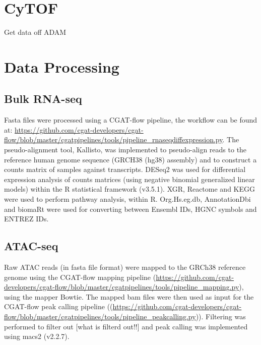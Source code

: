 \section{CyTOF}
Get data off ADAM


\section{Data Processing}\label{sec:data_processing}
\subsection{Bulk RNA-seq}
Fasta files were processed using a CGAT-flow\cite{sims2014cgat} pipeline, the workflow can be found at: \url{https://github.com/cgat-developers/cgat-flow/blob/master/cgatpipelines/tools/pipeline_rnaseqdiffexpression.py}.
The pseudo-alignment tool, Kallisto\cite{bray2016near}, was implemented to pseudo-align reads to the reference human genome sequence (GRCH38 (hg38) assembly) and to construct a counts matrix of samples against transcripts.
DESeq2\cite{love2014moderated} was used for differential expression analysis of  counts  matrices  (using  negative  binomial  generalized  linear  models) within the R statistical framework (v3.5.1).
XGR\cite{fang2016xgr}, Reactome\cite{fabregat2017reactome} and KEGG\cite{kanehisa2017kegg} were used to perform pathway analysis, within R\@.
Org.Hs.eg.db\cite{carlson2019org}, AnnotationDbi\cite{pages2020annotationdbi} and biomaRt\cite{durinck2009mapping} were used for converting between Ensembl IDs, HGNC symbols and ENTREZ IDs.

\subsection{ATAC-seq}
Raw ATAC reads (in fasta file format) were mapped to the GRCh38 reference genome using the CGAT-flow mapping pipeline (\url{https://github.com/cgat-developers/cgat-flow/blob/master/cgatpipelines/tools/pipeline_mapping.py}), using the mapper Bowtie.
The mapped bam files were then used as input for the CGAT-flow peak calling pipeline ((\url{https://github.com/cgat-developers/cgat-flow/blob/master/cgatpipelines/tools/pipeline_peakcalling.py})).
Filtering was performed to filter out [what is filterd out!!] and peak calling was implemented using macs2 (v2.2.7)\cite{zhang2008model}.


